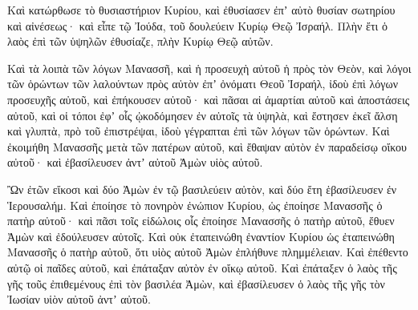 {Καὶ κατώρθωσε τὸ θυσιαστήριον Κυρίου, καὶ ἐθυσίασεν ἐπʼ αὐτὸ θυσίαν σωτηρίου καὶ αἰνέσεως· καὶ εἶπε τῷ Ἰούδα, τοῦ δουλεύειν Κυρίῳ Θεῷ Ἰσραήλ.
Πλὴν ἔτι ὁ λαὸς ἐπὶ τῶν ὑψηλῶν ἐθυσίαζε, πλὴν Κυρίῳ Θεῷ αὐτῶν.
\par }{\PP {}Καὶ τὰ λοιπὰ τῶν λόγων Μανασσῆ, καὶ ἡ προσευχὴ αὐτοῦ ἡ πρὸς τὸν Θεὸν, καὶ λόγοι τῶν ὁρώντων τῶν λαλούντων πρὸς αὐτὸν ἐπʼ ὀνόματι Θεοῦ Ἰσραήλ,
ἰδοὺ ἐπὶ λόγων προσευχῆς αὐτοῦ, καὶ ἐπήκουσεν αὐτοῦ· καὶ πᾶσαι αἱ ἁμαρτίαι αὐτοῦ καὶ ἀποστάσεις αὐτοῦ, καὶ οἱ τόποι ἐφʼ οἷς ᾠκοδόμησεν ἐν αὐτοῖς τὰ ὑψηλὰ, καὶ ἔστησεν ἐκεῖ ἄλση καὶ γλυπτὰ, πρὸ τοῦ ἐπιστρέψαι, ἰδοὺ γέγραπται ἐπὶ τῶν λόγων τῶν ὁρώντων.
Καὶ ἐκοιμήθη Μανασσῆς μετὰ τῶν πατέρων αὐτοῦ, καὶ ἔθαψαν αὐτὸν ἐν παραδείσῳ οἴκου αὐτοῦ· καὶ ἐβασίλευσεν ἀντʼ αὐτοῦ Ἀμὼν υἱὸς αὐτοῦ.
\par }{\PP {}Ὢν ἐτῶν εἴκοσι καὶ δύο Ἀμὼν ἐν τῷ βασιλεύειν αὐτὸν, καὶ δύο ἔτη ἑβασίλευσεν ἐν Ἱερουσαλήμ.
Καὶ ἐποίησε τὸ πονηρὸν ἐνώπιον Κυρίου, ὡς ἐποίησε Μανασσῆς ὁ πατὴρ αὐτοῦ· καὶ πᾶσι τοῖς εἰδώλοις οἷς ἐποίησε Μανασσῆς ὁ πατὴρ αὐτοῦ, ἔθυεν Ἀμὼν καὶ ἐδούλευσεν αὐτοῖς.
Καὶ οὐκ ἐταπεινώθη ἐναντίον Κυρίου ὡς ἐταπεινώθη Μανασσῆς ὁ πατὴρ αὐτοῦ, ὅτι υἱὸς αὐτοῦ Ἀμὼν ἐπλήθυνε πλημμέλειαν.
Καὶ ἐπέθεντο αὐτῷ οἱ παῖδες αὐτοῦ, καὶ ἐπάταξαν αὐτὸν ἐν οἴκῳ αὐτοῦ.
Καὶ ἐπάταξεν ὁ λαὸς τῆς γῆς τοῦς ἐπιθεμένους ἐπὶ τὸν βασιλέα Ἀμὼν, καὶ ἐβασίλευσεν ὁ λαὸς τῆς γῆς τὸν Ἰωσίαν υἱὸν αὐτοῦ ἀντʼ αὐτοῦ.

}
